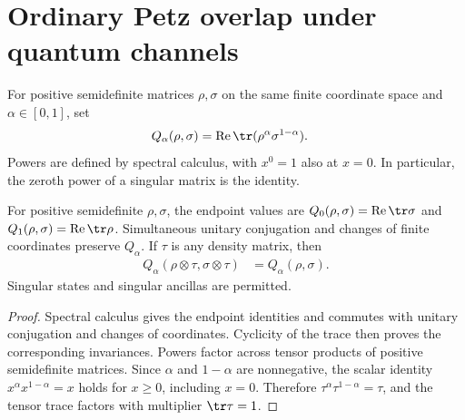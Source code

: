 \section{Ordinary Petz overlap under quantum channels}
\label{sec:petz_overlap}

\begin{definition}
    \label{def:petz_overlap}
    \leanok
    For positive semidefinite matrices $\rho,\sigma$ on the same finite
    coordinate space and $\alpha\in[0,1]$, set
    \begin{align}
        Q_\alpha(\rho,\sigma)
            &=\operatorname{Re}\tr(\rho^\alpha\sigma^{1-\alpha}).
        \label{eq:petz_overlap_definition}
    \end{align}
    Powers are defined by spectral calculus, with $x^0=1$ also at $x=0$.
    In particular, the zeroth power of a singular matrix is the identity.
\end{definition}

\begin{lemma}
    \label{lem:petz_overlap_invariance}
    \leanok
    For positive semidefinite $\rho,\sigma$, the endpoint values are
    $Q_0(\rho,\sigma)=\operatorname{Re}\tr\sigma$ and
    $Q_1(\rho,\sigma)=\operatorname{Re}\tr\rho$.
    Simultaneous unitary conjugation and changes of finite coordinates
    preserve $Q_\alpha$. If $\tau$ is any density matrix, then
    \begin{align}
        Q_\alpha(\rho\otimes\tau,\sigma\otimes\tau)
            &=Q_\alpha(\rho,\sigma).
        \label{eq:petz_overlap_ancilla}
    \end{align}
    Singular states and singular ancillas are permitted.
\end{lemma}
\begin{proof}
    \leanok
    Spectral calculus gives the endpoint identities and commutes with
    unitary conjugation and changes of coordinates. Cyclicity of the trace
    then proves the corresponding invariances. Powers factor across tensor
    products of positive semidefinite matrices. Since $\alpha$ and $1-\alpha$
    are nonnegative, the scalar identity
    $x^\alpha x^{1-\alpha}=x$ holds for $x\ge0$, including $x=0$.
    Therefore $\tau^\alpha\tau^{1-\alpha}=\tau$, and the tensor trace
    factors with multiplier $\tr\tau=1$.
\end{proof}

